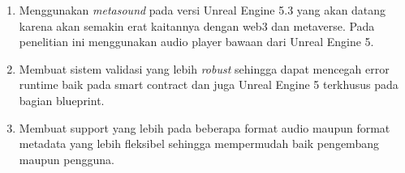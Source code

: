 \begin{enumerate}[nolistsep]

  \item Menggunakan \emph{metasound} pada versi Unreal Engine 5.3 yang akan datang karena akan semakin erat kaitannya dengan web3 dan metaverse. Pada penelitian ini menggunakan audio player bawaan dari Unreal Engine 5.

  \item Membuat sistem validasi yang lebih \emph{robust} sehingga dapat mencegah error runtime baik pada smart contract dan juga Unreal Engine 5 terkhusus pada bagian blueprint.

  \item Membuat support yang lebih pada beberapa format audio maupun format metadata yang lebih fleksibel sehingga mempermudah baik pengembang maupun pengguna.

\end{enumerate}
